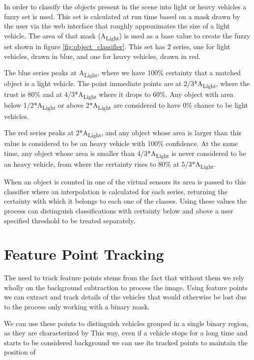 In order to classify the objects present in the scene into light or heavy vehicles a fuzzy set is used. This set is calculated at run time based on a mask drawn by the user via the web interface that roughly approximates the size of a light vehicle. The area of that mask (A\textsubscript{Light}) is used as a base value to create the fuzzy set shown in figure \ref{fig:object_classifier}. This set has 2 series, one for light vehicles, drawn in blue, and one for heavy vehicles, drawn in red.

The blue series peaks at A\textsubscript{Light}, where we have 100\% certainty that a matched object is a light vehicle. The point immediate points are at 2/3*A\textsubscript{Light}, where the trust is 80\% and at 4/3*A\textsubscript{Light} where it drops to 60\%. Any object with area below 1/2*A\textsubscript{Light} or above 2*A\textsubscript{Light} are considered to have 0\% chance to be light vehicles.

The red series peaks at 2*A\textsubscript{Light}, and any object whose area is larger than this value is considered to be an heavy vehicle with 100\% confidence. At the same time, any object whose area is smaller than 4/3*A\textsubscript{Light} is never considered to be an heavy vehicle, from where the certainty rises to 80\% at 5/3*A\textsubscript{Light}.

When an object is counted in one of the virtual sensors its area is passed to this classifier where an interpolation is calculated for each series, returning the certainty with which it belongs to each one of the classes. Using these values the process can distinguish classifications with certainty below and above a user specified threshold to be treated separately.

\section{Feature Point Tracking}


The need to track feature points stems from the fact that without them we rely wholly on the background subtraction to process the image. Using feature points we can extract and track details of the vehicles that would otherwise be lost due to the process only working with a binary mask. 

We can use these points to distinguish vehicles grouped in a single binary region, as they are characterized by 
This way, even if a vehicle stops for a long time and starts to be considered background we can use its tracked points to maintain the position of 


